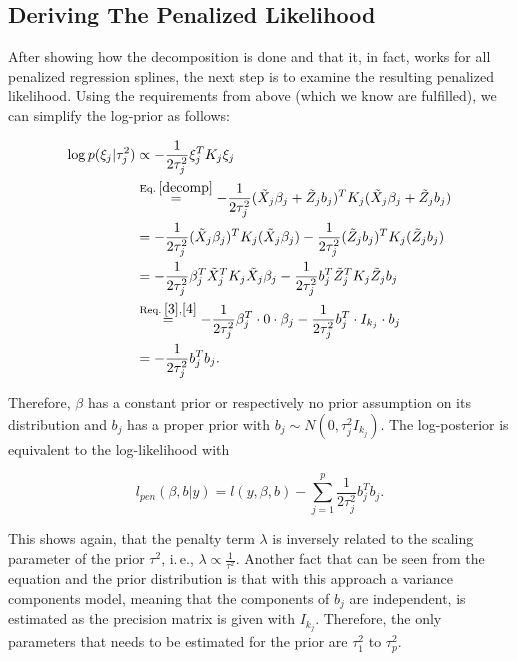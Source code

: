 \documentclass[12pt]{article}
\begin{document}
\subsection{Deriving The Penalized Likelihood}\label{likelihood}

After showing how the decomposition is done and that it, in fact, works for all penalized regression splines, the next step is to examine the resulting penalized likelihood. Using the requirements from above (which we know are fulfilled), we can simplify the log-prior as follows:


\begin{align*}
\log p(\xi_j|\tau_j^2)  &\propto -\frac{1}{2\tau^2_j} \xi_j^TK_j \xi_j\\ 
&\overset{\text{Eq.}\:\ref{decomp}}{=} -\frac{1}{2\tau^2_j} (\tilde{X}_j \beta_j + \tilde{Z}_j b_j)^TK_j (\tilde{X}_j \beta_j + \tilde{Z}_j b_j) \\
&= -\frac{1}{2\tau^2_j} (\tilde{X}_j \beta_j)^TK_j (\tilde{X}_j \beta_j) 
-\frac{1}{2\tau^2_j} (\tilde{Z}_j b_j)^TK_j (\tilde{Z}_j b_j)\\
&= -\frac{1}{2\tau^2_j} \beta_j^T \tilde{X}_j^T K_j \tilde{X}_j \beta_j 
-\frac{1}{2\tau^2_j} b_j^T \tilde{Z}_j^T K_j \tilde{Z}_j b_j\\
&\overset{\text{Req.}\:\ref{3},\ref{4}}{=} -\frac{1}{2\tau^2_j} \beta_j^T \cdot 0 \cdot \beta_j 
-\frac{1}{2\tau^2_j} b_j^T \cdot I_{k_j} \cdot b_j\\
&= -\frac{1}{2\tau_j^2} b_j^T b_j.
\end{align*}


Therefore, $\beta$ has a constant prior or respectively no prior assumption on its distribution and $b_j$ has a proper prior with $b_j \sim N(0,\tau_j^2I_{k_j})$. The log-posterior is equivalent to the log-likelihood with

$$l_{pen}(\beta,b|y) = l(y,\beta,b) - \sum_{j=1}^p \frac{1}{2\tau_j^2} b_j^T  b_j. $$

This shows again, that the penalty term $\lambda$ is inversely related to the scaling parameter of the prior $\tau^2$, i.\,e., $\lambda \propto \frac{1}{\tau^2}$. Another fact that can be seen from the equation and the prior distribution is that with this approach a variance components model, meaning that the components of $b_j$ are independent, is estimated as the precision matrix is given with $I_{k_j}$. Therefore, the only parameters that needs to be estimated for the prior are $\tau^2_1$  to $\tau^2_p$.
\end{document}
